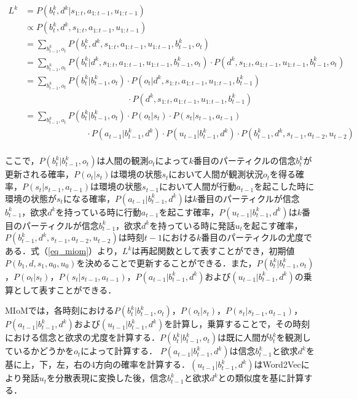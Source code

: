 \begin{equation}
  \begin{split}
  \label{eq_miom}
  L^k&=P(b_t^k,d^k|s_{1:t},a_{1:t-1},u_{1:t-1})\\
  &\propto P(b_t^k,d^k,s_{1:t},a_{1:t-1},u_{1:t-1})\\
  &= \sum_{b_{t-1}^k,o_t}P(b_t^k,d^k,s_{1:t},a_{1:t-1},u_{1:t-1},b_{t-1}^k,o_t)\\
  &= \sum_{b_{t-1}^k,o_t}P(b_t^k|d^k,s_{1:t},a_{1:t-1},u_{1:t-1},b_{t-1}^k,o_t)\cdot P(d^k,s_{1:t},a_{1:t-1},u_{1:t-1},b_{t-1}^k,o_t)\\
  &= \sum_{b_{t-1}^k,o_t}P(b_t^k|b_{t-1}^k,o_t)\cdot P(o_t|d^k,s_{1:t},a_{1:t-1},u_{1:t-1},b_{t-1}^k)\\
  &\hspace{5cm} \cdot P(d^k,s_{1:t},a_{1:t-1},u_{1:t-1},b_{t-1}^k)\\
  &= \sum_{b_{t-1}^k,o_t}P(b_t^k|b_{t-1}^k,o_t)\cdot P(o_t|s_t)\cdot P(s_t|s_{t-1},a_{t-1})\\
  &\hspace{3cm} \cdot P(a_{t-1}|b_{t-1}^k,d^k)\cdot P(u_{t-1}|b_{t-1}^k,d^k)\cdot P(b_{t-1}^k,d^k,s_{t-1},a_{t-2},u_{t-2})\\
  \end{split}
\end{equation}


ここで，$P(b_t^k|b_{t-1}^k,o_t)$は人間の観測$o_t$によって$k$番目のパーティクルの信念$b_t^k$が更新される確率，$P(o_t|s_t)$は環境の状態$s_t$において人間が観測状況$o_t$を得る確率，$P(s_t|s_{t-1},a_{t-1})$は環境の状態$s_{t-1}$において人間が行動$a_{t-1}$を起こした時に環境の状態が$s_{t}$になる確率，$P(a_{t-1}|b_{t-1}^k,d^k)$は$k$番目のパーティクルが信念$b_{t-1}^k$，欲求$d^k$を持っている時に行動$a_{t-1}$を起こす確率，$P(u_{t-1}|b_{t-1}^k,d^k)$は$k$番目のパーティクルが信念$b_{t-1}^k$，欲求$d^k$を持っている時に発話$u_t$を起こす確率，$P(b_{t-1}^k,d^k,s_{t-1},a_{t-2},u_{t-2})$は時刻$t-1$における$k$番目のパーティクルの尤度である．式（\ref{eq_miom}）より，$L^k$は再起関数として表すことができ，初期値$P(b_1,d,s_1,a_0,u_0)$を決めることで更新することができる．また，$P(b_t^k|b_{t-1}^k,o_t)$，$P(o_t|s_t)$，$P(s_t|s_{t-1},a_{t-1})$，$P(a_{t-1}|b_{t-1}^k,d^k)$および$(u_{t-1}|b_{t-1}^k,d^k)$の乗算として表すことができる．

\par
MIoMでは，各時刻における$P(b_t^k|b_{t-1}^k,o_t)$，$P(o_t|s_t)$，$P(s_t|s_{t-1},a_{t-1})$，$P(a_{t-1}|b_{t-1}^k,d^k)$および$(u_{t-1}|b_{t-1}^k,d^k)$を計算し，乗算することで，その時刻における信念と欲求の尤度を計算する．$P(b_t^k|b_{t-1}^k,o_t)$は既に人間が$b_t^k$を観測しているかどうかを$o_t$によって計算する．
$P(a_{t-1}|b_{t-1}^k,d^k)$は信念$b_{t-1}^k$と欲求$d^k$を基に上，下，左，右の4方向の確率を計算する．$(u_{t-1}|b_{t-1}^k,d^k)$はWord2Vecにより発話$u_t$を分散表現に変換した後，信念$b_{t-1}^k$と欲求$d^k$との類似度を基に計算する．
